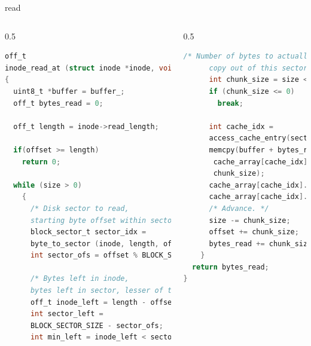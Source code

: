 \documentclass[10pt]{beamer}
\begin{document}
\begin{frame}[fragile]{read}
\begin{columns}
\begin{column}{0.5\textwidth}
\begin{lstlisting}[language=C]
off_t
inode_read_at (struct inode *inode, void *buffer_, off_t size, off_t offset) 
{
  uint8_t *buffer = buffer_;
  off_t bytes_read = 0;

  off_t length = inode->read_length;

  if(offset >= length)
    return 0;

  while (size > 0) 
    {
      /* Disk sector to read, 
      starting byte offset within sector. */
      block_sector_t sector_idx = 
      byte_to_sector (inode, length, offset);
      int sector_ofs = offset % BLOCK_SECTOR_SIZE;

      /* Bytes left in inode,
      bytes left in sector, lesser of the two. */
      off_t inode_left = length - offset;
      int sector_left = 
      BLOCK_SECTOR_SIZE - sector_ofs;
      int min_left = inode_left < sector_left ? inode_left : sector_left;
\end{lstlisting}
\end{column}
\begin{column}{0.5\textwidth}
\begin{lstlisting}[language=C]
      /* Number of bytes to actually 
      copy out of this sector. */
      int chunk_size = size < min_left ? size : min_left;
      if (chunk_size <= 0)
        break;

      int cache_idx = 
      access_cache_entry(sector_idx, false);
      memcpy(buffer + bytes_read, 
       cache_array[cache_idx].block + sector_ofs,
       chunk_size);
      cache_array[cache_idx].accessed = true;
      cache_array[cache_idx].open_cnt--;     
      /* Advance. */
      size -= chunk_size;
      offset += chunk_size;
      bytes_read += chunk_size;
    }
  return bytes_read;
}
\end{lstlisting}
\end{column}
\end{columns}
\end{frame}
\end{document}

